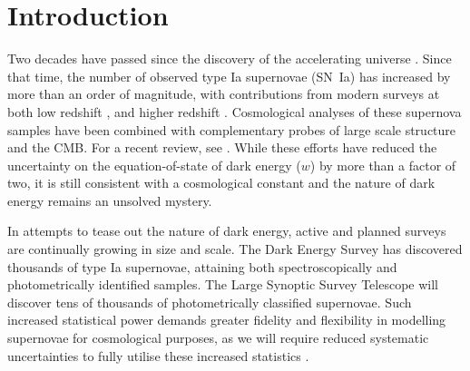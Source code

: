 \documentclass[a4paper,fleqn,usenatbib]{emulateapj}
\begin{document}

\section{Introduction}




Two decades have passed since the discovery of the accelerating universe \citep{Riess1998, Perlmutter1999}. Since that time, the number of observed type Ia supernovae (SN~Ia) has increased by more than an order of magnitude, with contributions from modern surveys at both low redshift \citep{Bailey2008, Freedman2009, Hicken2009,  Contreras2010, Conley2011}, and higher redshift \citep{Astier2006, Wood-Vasey2007, Frieman2008, Balland2009, Amanullah2010, chambers2016panstarrs, sako2018sdss}. Cosmological analyses of these supernova samples \citep{Kowalski2008, Kessler2009, Conley2011, Suzuki2012, Betoule2014, Rest2014, Scolnic2017} have been combined with complementary probes of large scale structure and the CMB. For a recent review, see \citet{Huterer2018}. While these efforts have reduced the uncertainty on the equation-of-state of dark energy ($w$) by more than a factor of two, it is still consistent with a cosmological constant and the nature of dark energy remains an unsolved mystery.


In attempts to tease out the nature of dark energy, active and planned surveys are continually growing in size and scale. The Dark Energy Survey \citep[DES,][]{Bernstein2012, Abbott2016} has discovered thousands of type Ia supernovae, attaining both spectroscopically and photometrically identified samples. The Large Synoptic Survey Telescope \citep[LSST,][]{Ivezic2008, LSSTScienceCollaboration2009} will discover tens of thousands of photometrically classified supernovae. Such increased statistical power demands greater fidelity and flexibility in modelling supernovae for cosmological purposes, as we will require reduced systematic uncertainties to fully utilise these increased statistics \citep{Betoule2014, Scolnic2017}.
\end{document}
